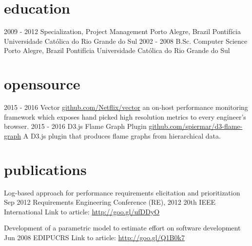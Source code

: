 \documentclass[]{mspier-cv}
\begin{document}
\section{education}

\begin{entrylist}
  \entry
    {2009 - 2012}
    {Specialization, Project Management}
    {Porto Alegre, Brazil}
    {Pontifícia Universidade Católica do Rio Grande do Sul}
  \entry
    {2002 - 2008}
    {B.Sc. Computer Science}
    {Porto Alegre, Brazil}
    {Pontifícia Universidade Católica do Rio Grande do Sul}
\end{entrylist}

\section{opensource}

\begin{entrylist}
  \entry
    {2015 - 2016}
    {Vector}
    {\href{https://github.com/Netflix/vector}{github.com/Netflix/vector}}
    {an on-host performance monitoring framework which exposes hand picked high resolution metrics to every engineer’s browser.}
  \entry
    {2015 - 2016}
    {D3.js Flame Graph Plugin}
    {\href{https://github.com/spiermar/d3-flame-graph}{github.com/spiermar/d3-flame-graph}}
    {A D3.js plugin that produces flame graphs from hierarchical data.}
\end{entrylist}

\section{publications}

\publicationitem
  {Log-based approach for performance requirements elicitation and prioritization}
  {Sep 2012}
  {Requirements Engineering Conference (RE), 2012 20th IEEE International}
  {Link to article: \url{http://goo.gl/ufDDyO}}

\publicationitem
  {Development of a parametric model to estimate effort on software development}
  {Jun 2008}
  {EDIPUCRS}
  {Link to article: \url{http://goo.gl/Q1B0k7}}

%
\end{document}
